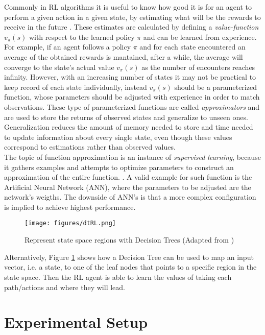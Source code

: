 Commonly in RL algorithms it is useful to know how good it is for an agent to perform a given action in a given state, by estimating what will be the rewards to receive in the future \cite{rlintro}. These estimates are calculated by defining a \textit{value-function} $v_{\pi}(s)$ with respect to the learned policy $\pi$ and can be learned from experience. For example, if an agent follows a policy $\pi$ and for each state encountered an average of the obtained rewards is mantained, after a while, the average will converge to the state's actual value $v_{\pi}(s)$ as the number of encounters reaches infinity. However, with an increasing number of states it may not be practical to keep record of each state individually, instead $v_{\pi}(s)$ should be a parameterized function, whose parameters should be adjusted with experience in order to match observations. These type of parameterized functions are called \textit{approximators} and are used to store the returns of observed states and generalize to unseen ones. Generalization reduces the amount of memory needed to store and time needed to update information about every single state, even though these values correspond to estimations rather than observed values.
\\

The topic of function approximation is an instance of \textit{supervised learning}, because it gathers examples and attempts to optimize parameters to construct an approximation of the entire function. \cite{rlintro}.
A valid example for such function is the Artificial Neural Network (ANN), where the parameters to be adjusted are the network's weigths. The downside of ANN's is that a more complex configuration is implied to achieve highest performance.

\begin{figure}[h]
	\centering
	\texttt{[image: figures/dtRL.png]}
	\caption{Represent state space regions with Decision Trees (Adapted from \cite{dtRL})}
	\label{dt}
\end{figure}

Alternatively, Figure \ref{dt} shows how a Decision Tree can be used to map an input vector, i.e. a state, to one of the leaf nodes that points to a specific region in the state space. Then the RL agent is able to learn the values of taking each path/actions and where they will lead. \cite{dtRL}

\section{Experimental Setup}\label{exp}

